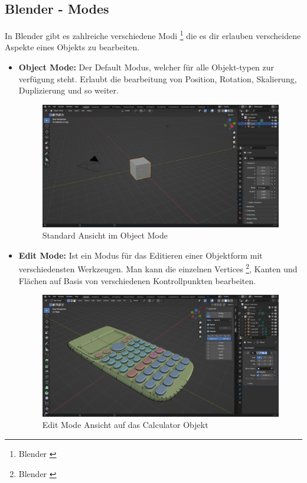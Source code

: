 \subsection{Blender - Modes}
In Blender gibt es zahlreiche verschiedene Modi \footnote{Blender \cite{Modi}} die es dir erlauben verscheidene Aspekte
eines Objekts zu bearbeiten.
\begin{itemize}
\item \textbf{Object Mode:} Der Default Modus, welcher für alle Objekt-typen zur verfügung steht. Erlaubt die bearbeitung
von Position, Rotation, Skalierung, Duplizierung und so weiter.
\begin{figure}[H]
\centering
\includegraphics[width=1\textwidth]{images/defaultobjectmode.png}
\caption{Standard Ansicht im Object Mode}
\label{fig:defaultobjectmode}
\end{figure}

\item \textbf{Edit Mode:} Ist ein Modus für das Editieren einer Objektform mit verschiedensten Werkzeugen. Man kann die
einzelnen Vertices \footnote{Blender \cite{Vertices}}, Kanten und Flächen auf Basis von verschiedenen Kontrollpunkten bearbeiten.
\begin{figure}[H]
\centering
\includegraphics[width=1\textwidth]{images/calculatoreditmode.png}
\caption{Edit Mode Ansicht auf das Calculator Objekt}
\label{fig:calculatoreditmode}
\end{figure}


\end{itemize}

